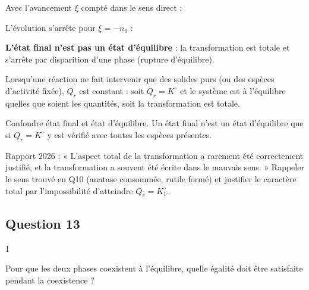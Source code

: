 \documentclass[11pt,a4paper]{article}
\newcommand{\equationajustee}[1]{%
  \sbox{\boiteequation}{$\displaystyle #1$}%
  \ifdim\wd\boiteequation>\linewidth
    \[\resizebox{\linewidth}{!}{\usebox{\boiteequation}}\]%
  \else
    \[#1\]%
  \fi}
\begin{document}
Avec l'avancement \(\xi\) compté dans le sens direct :

\equationajustee{\begin{aligned}
n(\mathrm R) &= n_0 - \xi \\
n(\mathrm A) &= n_0 + \xi
\end{aligned}}

L'évolution s'arrête pour \(\xi = -n_0\) :

\equationajustee{\boxed{n(\mathrm A)_f = 0}}

\equationajustee{\boxed{n(\mathrm R)_f = 2\ \text{mol}}}

\textbf{L'état final n'est pas un état d'équilibre} : la transformation est totale et s'arrête par disparition d'une phase (rupture d'équilibre).

\begin{methode}

Lorsqu'une réaction ne fait intervenir que des solides purs (ou des espèces d'activité fixée), \(Q_r\) est constant : soit \(Q_r = K^\circ\) et le système est à l'équilibre quelles que soient les quantités, soit la transformation est totale.

\end{methode}

\begin{piege}

Confondre état final et état d'équilibre. Un état final n'est un état d'équilibre que si \(Q_r = K^\circ\) y est vérifié avec toutes les espèces présentes.

\end{piege}

\begin{jury}

Rapport 2026 : « L'aspect total de la transformation a rarement été correctement justifié, et la transformation a souvent été écrite dans le mauvais sens. » Rappeler le sens trouvé en Q10 (anatase consommée, rutile formé) et justifier le caractère total par l'impossibilité d'atteindre \(Q_r = K^\circ_1\).

\end{jury}

\hypertarget{question-13}{%
\subsection{Question 13}\label{question-13}}

\begin{indication}{1}

Pour que les deux phases coexistent à l'équilibre, quelle égalité doit être satisfaite pendant la coexistence ?

\end{indication}
\end{document}

